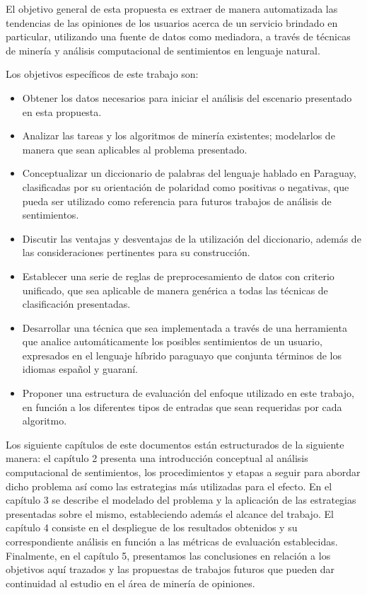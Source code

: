 El objetivo general de esta propuesta es extraer de manera automatizada las tendencias de las  opiniones de los usuarios acerca de un servicio brindado en particular, utilizando una fuente de datos como mediadora, a trav\'es de t\'ecnicas de miner\'ia y an\'alisis computacional de sentimientos en lenguaje natural.
\newline

Los objetivos espec\'ificos de este trabajo son:
\newline
\begin{itemize}
\item Obtener los datos necesarios para iniciar el an\'alisis del escenario presentado en esta propuesta.
\item Analizar las tareas y los algoritmos de miner\'ia existentes; modelarlos de manera que sean aplicables al problema presentado.
\item Conceptualizar un diccionario de palabras del lenguaje hablado en Paraguay, clasificadas por su orientaci\'on de polaridad como positivas o negativas, que pueda ser utilizado como referencia para futuros trabajos de an\'alisis de sentimientos.
\item Discutir las ventajas y desventajas de la utilizaci\'on del diccionario, adem\'as de las consideraciones pertinentes para su construcci\'on.
\item Establecer una serie de reglas de preprocesamiento de datos con criterio unificado, que sea aplicable de manera gen\'erica a todas las t\'ecnicas de clasificaci\'on presentadas. 
\item Desarrollar una t\'ecnica que sea implementada a trav\'es de una herramienta que analice autom\'aticamente los posibles sentimientos de un usuario, expresados en el lenguaje h\'ibrido paraguayo que conjunta t\'erminos de los idiomas espa\~nol y guaran\'i.
\item Proponer una estructura de evaluaci\'on del enfoque utilizado en este trabajo, en funci\'on a los diferentes tipos de entradas que sean requeridas por cada algoritmo.
\end{itemize}

Los siguiente cap\'itulos de este documentos est\'an estructurados de la siguiente manera: el cap\'itulo 2 presenta una introducci\'on conceptual al an\'alisis computacional de sentimientos, los procedimientos y etapas a seguir para abordar dicho problema as\'i como las estrategias m\'as utilizadas para el efecto. En el cap\'itulo 3 se describe el modelado del problema y la aplicaci\'on de las estrategias presentadas sobre el mismo, estableciendo adem\'as el alcance del trabajo. El cap\'itulo 4 consiste en el despliegue de los resultados obtenidos y su correspondiente an\'alisis en funci\'on a las m\'etricas de evaluaci\'on establecidas. Finalmente, en el cap\'itulo 5, presentamos las conclusiones en relaci\'on a los objetivos aqu\'i trazados y las propuestas de trabajos futuros que pueden dar continuidad al estudio en el \'area de miner\'ia de opiniones.
